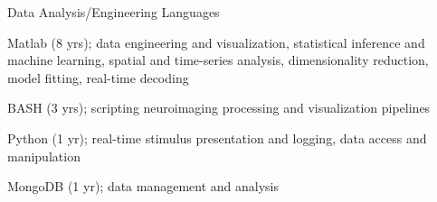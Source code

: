 \vspace*{-0.25cm}

\vspace*{0.3cm}

\begin{cventries}

\cventry
    {Data Analysis/Engineering} %
    {Languages} %
    {\vspace*{-0.05cm}}
    {\vspace*{-0.05cm}} %
    {
      \begin{cvitems} %
        \item {Matlab (8 yrs); data engineering and visualization, statistical inference and machine learning, spatial and time-series analysis, dimensionality reduction, model fitting, real-time decoding}
        \item {BASH (3 yrs); scripting neuroimaging processing and visualization pipelines}
        \item {Python (1 yr); real-time stimulus presentation and logging, data access and manipulation}
        \item {MongoDB (1 yr); data management and analysis}
      \end{cvitems}
    }
    \vspace*{0.1cm}


\end{cventries}
